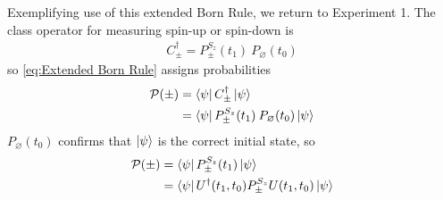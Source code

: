 Exemplifying use of this extended Born Rule, we return to Experiment 1. The class operator for measuring spin-up or spin-down is
\begin{align}
  C_\pm^\dagger = P^{S_z}_\pm (t_1) \: P_\varnothing (t_0)
\end{align}
so \autoref{eq:Extended Born Rule} assigns probabilities
\begin{align}
  \mathcal{P}(\pm) &= \bra{\psi} C_\pm^\dagger \ket{\psi} \\ \nonumber
  &= \bra{\psi} P^{S_z}_\pm (t_1) \: P_\varnothing (t_0) \ket{\psi}
\end{align}
$P_\varnothing (t_0)$ confirms that $\ket{\psi}$ is the correct initial state, so
\begin{align}
  \mathcal{P}(\pm) &= \bra{\psi} P^{S_z}_\pm (t_1) \ket{\psi} \\ \nonumber
  &= \bra{\psi} U^\dagger(t_1, t_0) P^{S_z}_\pm U(t_1, t_0) \ket{\psi}
\end{align}

